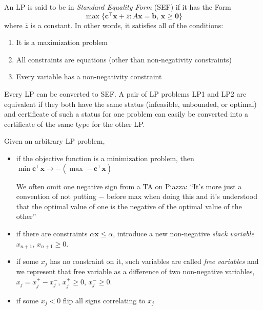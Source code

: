 \begin{defbox}
    \begin{definition}
        An LP is said to be in \emph{Standard Equality Form} (SEF) if it has the Form
        \[ \max \{\bm{c}^\top \bm{x}+\bar{z} : A \bm{x}=\bm{b},\,\bm{x}\geqslant  \bm{0}\}\]
        where $ \bar{z} $ is a constant.
        In other words, it satisfies all of the conditions:
        \begin{enumerate}[label=(\arabic*)]
            \item It is a maximization problem
            \item All constraints are equations (other than non-negativity
                  constraints)
            \item Every variable has a non-negativity constraint
        \end{enumerate}
    \end{definition}
\end{defbox}
Every LP can be converted to SEF\@. A pair of LP problems LP1 and LP2 are equivalent if they both have the
same status (infeasible, unbounded, or optimal) and certificate of such a status for one problem can easily
be converted into a certificate of the same type for the other LP\@.

Given an arbitrary LP problem,
\begin{itemize}
    \item if the objective function is a minimization problem, then
          $\min \bm{c}^\top \bm{x}\rightarrow -(\max -\bm{c}^\top \bm{x})$
          \begin{remark}
              We often omit one negative sign
              from a TA on Piazza: ``It's more just a convention of not putting $ - $
              before max when doing this and it's understood that the
              optimal value of one is the negative of the optimal value of the other''
          \end{remark}
    \item if there are constraints $\alpha\bm{x}\leqslant \alpha$, introduce a new
          non-negative \emph{slack variable} $x_{n+1}$, $x_{n+1}\geqslant  0$.
    \item if some $x_j$ has no constraint on it, such variables are called \emph{free variables} and
          we represent that free variable as a difference of two non-negative variables,
          $x_j=x_j^+-x_j^-$, $x_j^+\geqslant  0$, $x_j^-\geqslant  0$.
    \item if some $x_j<0$ flip all signs correlating to $x_j$
\end{itemize}

